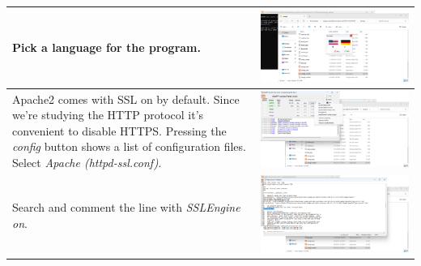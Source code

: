 \documentclass[11pt,a4paper]{report}
\begin{document}
\begin{flushleft}
\begin{center}
\begin{longtable}{ m{5cm} l }
                        Pick a language for the program.
                        & \includegraphics[scale=0.303,valign=c]{install_xampp14} \\
                        \hline
                        
                        Apache2 comes with SSL on by default. Since we're studying the HTTP protocol it's convenient to disable HTTPS. Pressing the \textit{config} button shows a list of configuration files. Select \textit{Apache (httpd-ssl.conf)}.
                        & \includegraphics[scale=0.285,valign=c]{install_xampp15} \\
                        \hline
                        
                        Search and comment the line with \textit{SSLEngine on}.
                        & \includegraphics[scale=0.285,valign=c]{install_xampp16} \\
                        \hline
                        

\end{longtable}
\end{center}
\end{flushleft}
\end{document}
